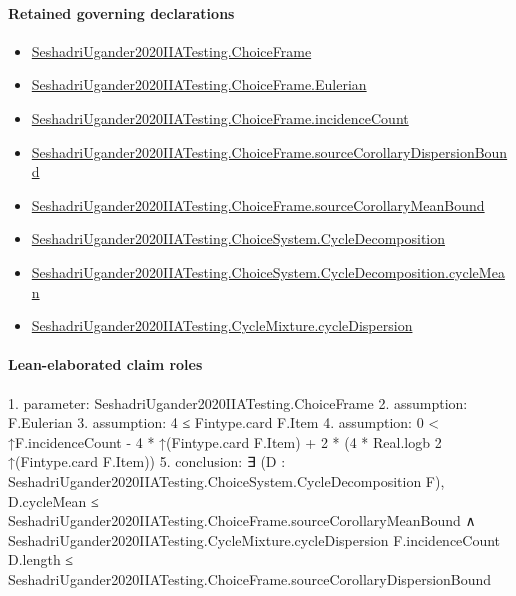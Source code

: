 \documentclass[10pt]{article}
\begin{document}
\paragraph{Retained governing declarations}
\begin{itemize}\raggedright
\item \hyperlink{paper-prerequisite-0b24d39c6f4d1898}{Seshadri\allowbreak{}Ugander2020\allowbreak{}IIA\allowbreak{}Testing.\allowbreak{}Choice\allowbreak{}Frame}
\item \hyperlink{paper-prerequisite-182958924bb3d984}{Seshadri\allowbreak{}Ugander2020\allowbreak{}IIA\allowbreak{}Testing.\allowbreak{}Choice\allowbreak{}Frame.\allowbreak{}Eulerian}
\item \hyperlink{governing-declaration-01f88aa0e8a82d94}{Seshadri\allowbreak{}Ugander2020\allowbreak{}IIA\allowbreak{}Testing.\allowbreak{}Choice\allowbreak{}Frame.\allowbreak{}incidence\allowbreak{}Count}
\item \hyperlink{governing-declaration-022f0e0499966af9}{Seshadri\allowbreak{}Ugander2020\allowbreak{}IIA\allowbreak{}Testing.\allowbreak{}Choice\allowbreak{}Frame.\allowbreak{}source\allowbreak{}Corollary\allowbreak{}Dispersion\allowbreak{}Bound}
\item \hyperlink{governing-declaration-c427e473c40fc8cd}{Seshadri\allowbreak{}Ugander2020\allowbreak{}IIA\allowbreak{}Testing.\allowbreak{}Choice\allowbreak{}Frame.\allowbreak{}source\allowbreak{}Corollary\allowbreak{}Mean\allowbreak{}Bound}
\item \hyperlink{paper-prerequisite-7ec2ce004f72e29f}{Seshadri\allowbreak{}Ugander2020\allowbreak{}IIA\allowbreak{}Testing.\allowbreak{}Choice\allowbreak{}System.\allowbreak{}Cycle\allowbreak{}Decomposition}
\item \hyperlink{paper-prerequisite-4f9c0f894e80708f}{Seshadri\allowbreak{}Ugander2020\allowbreak{}IIA\allowbreak{}Testing.\allowbreak{}Choice\allowbreak{}System.\allowbreak{}Cycle\allowbreak{}Decomposition.\allowbreak{}cycle\allowbreak{}Mean}
\item \hyperlink{paper-prerequisite-d1b6db8e571d96c2}{Seshadri\allowbreak{}Ugander2020\allowbreak{}IIA\allowbreak{}Testing.\allowbreak{}Cycle\allowbreak{}Mixture.\allowbreak{}cycle\allowbreak{}Dispersion}
\end{itemize}
\paragraph{Lean-elaborated claim roles}\begin{ReviewVerbatim}
1. parameter: SeshadriUgander2020IIATesting.ChoiceFrame
2. assumption: F.Eulerian
3. assumption: 4 ≤ Fintype.card F.Item
4. assumption: 0 < ↑F.incidenceCount - 4 * ↑(Fintype.card F.Item) + 2 * (4 * Real.logb 2 ↑(Fintype.card F.Item))
5. conclusion: ∃ (D : SeshadriUgander2020IIATesting.ChoiceSystem.CycleDecomposition F),
  D.cycleMean ≤ SeshadriUgander2020IIATesting.ChoiceFrame.sourceCorollaryMeanBound ∧
    SeshadriUgander2020IIATesting.CycleMixture.cycleDispersion F.incidenceCount D.length ≤
      SeshadriUgander2020IIATesting.ChoiceFrame.sourceCorollaryDispersionBound
\end{ReviewVerbatim}
\end{document}
